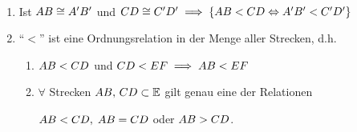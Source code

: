 \begin{thm}\label{thm:satz.s1g}\ %
    \renewcommand{\labelenumi}{\alph{enumi})} %
    \renewcommand{\labelenumii}{\alph{enumi}\textsubscript{\arabic{enumii}})}
    \begin{enumerate}
        \item\label{thm:satz.slg.item1} Ist ${AB} \cong {A'B'}$ und ${CD} \cong
            {C'D'}\; \Longrightarrow\; \{{AB} < {CD} \Leftrightarrow {A'B'} <
            {C'D'}\}$

        \item "`$ < $"' ist eine Ordnungsrelation in der Menge aller Strecken, d.h.
            \begin{enumerate}
                \item\label{thm:satz.slg.item2-1} ${AB} < {CD}$ und ${CD} < {EF}\;
                    \Longrightarrow \; {AB} < {EF}$

                \item\label{thm:satz.slg.item2-2} $\forall$ Strecken ${AB},\, {CD} \subset
                    \mathbb E$ gilt genau eine der Relationen

                    ${AB} < {CD},\; {AB} = {CD}$ oder ${AB}>{CD}$.
            \end{enumerate}
    \end{enumerate}
\end{thm}


